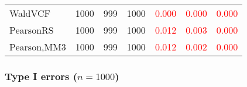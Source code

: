 \documentclass[
]{article}
\begin{document}
\begin{table}[H]
{\begin{tabular}[t]{lrrrrrr}
\hspace{1em}WaldVCF & 1000 & 999 & 1000 & \textcolor{red}{0.000} & \textcolor{red}{0.000} & \textcolor{red}{0.000}\\
\hspace{1em}PearsonRS & 1000 & 999 & 1000 & \textcolor{red}{0.012} & \textcolor{red}{0.003} & \textcolor{red}{0.000}\\
\hspace{1em}Pearson,MM3 & 1000 & 999 & 1000 & \textcolor{red}{0.012} & \textcolor{red}{0.002} & \textcolor{red}{0.000}\\
\bottomrule
\end{tabular}}
\endgroup{}
\end{table}

\hypertarget{type-i-errors-n1000-2}{%
\subsubsection{\texorpdfstring{Type I errors
(\(n=1000\))}{Type I errors (n=1000)}}\label{type-i-errors-n1000-2}}
\end{document}
